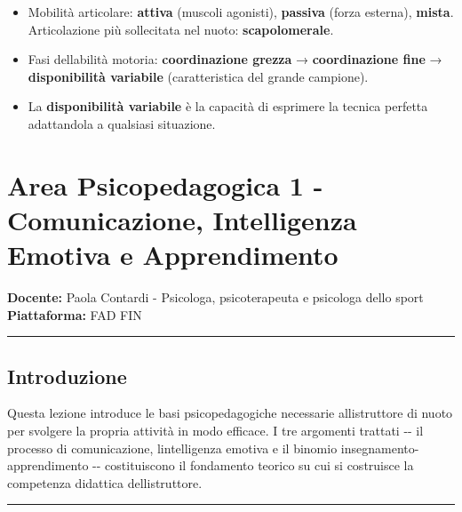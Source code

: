 \documentclass[a4paper,11pt]{article}
\begin{document}
\begin{itemize}
            La \textbf{resistenza} è la base di tutte le capacità condizionali;
            senza di essa non si sviluppano forza rapida, coordinazione e
            rapidità.
      \item
            Mobilità articolare: \textbf{attiva} (muscoli agonisti),
            \textbf{passiva} (forza esterna), \textbf{mista}. Articolazione più
            sollecitata nel nuoto: \textbf{scapolomerale}.
      \item
            Fasi dell\textquotesingle abilità motoria: \textbf{coordinazione
                  grezza} → \textbf{coordinazione fine} → \textbf{disponibilità
                  variabile} (caratteristica del grande campione).
      \item
            La \textbf{disponibilità variabile} è la capacità di esprimere la
            tecnica perfetta adattandola a qualsiasi situazione.
\end{itemize}

\section{Area Psicopedagogica 1 - Comunicazione, Intelligenza Emotiva e
  Apprendimento}\label{area-psicopedagogica-1---comunicazione-intelligenza-emotiva-e-apprendimento}

\textbf{Docente:} Paola Contardi - Psicologa, psicoterapeuta e psicologa
dello sport\\
\textbf{Piattaforma:} FAD FIN

\begin{center}\rule{0.5\linewidth}{0.5pt}\end{center}

\subsection{Introduzione}\label{introduzione-4}

Questa lezione introduce le basi psicopedagogiche necessarie
all\textquotesingle istruttore di nuoto per svolgere la propria attività
in modo efficace. I tre argomenti trattati -\/- il processo di
comunicazione, l\textquotesingle intelligenza emotiva e il binomio
insegnamento-apprendimento -\/- costituiscono il fondamento teorico su
cui si costruisce la competenza didattica
dell\textquotesingle istruttore.

\begin{center}\rule{0.5\linewidth}{0.5pt}\end{center}
\end{document}
